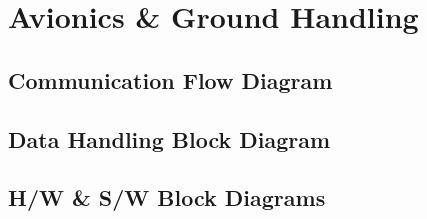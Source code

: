 \chapter{Avionics \& Ground Handling}
\setlength{\parindent}{15pt}
\label{ch:avio_grou_hand}

\section{Communication Flow Diagram}
\label{sec:comm_flow_diag}

\section{Data Handling Block Diagram}
\label{sec:data_hand_bloc_diag}

\section{H/W \& S/W Block Diagrams}
\label{sec:hw_sw_bloc_diag}